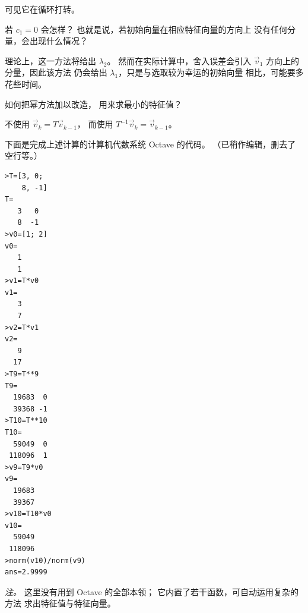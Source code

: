 \begin{exercises}
\begin{answer}
\begin{exparts}
\begin{lstlisting}
\end{lstlisting}
          可见它在循环打转。
       \end{exparts}
     \end{answer}
  \item
      若 $c_1=0$ 会怎样？
      也就是说，若初始向量在相应特征向量的方向上
      没有任何分量，会出现什么情况？
     \begin{answer}
       理论上，这一方法将给出 $\lambda_2$。
       然而在实际计算中，舍入误差会引入
       $\vec{v}_1$ 方向上的分量，因此该方法
       仍会给出 $\lambda_1$，只是与选取较为幸运的初始向量
       相比，可能要多花些时间。
     \end{answer}
  \item
    如何把幂方法加以改造，
    用来求最小的特征值？
    \begin{answer}
      不使用 $\vec{v}_k=T\vec{v}_{k-1}$，
      而使用 $T^{-1}\vec{v}_k=\vec{v}_{k-1}$。
    \end{answer}
\end{exercises}

\announcecomputercode
下面是完成上述计算的计算机代数系统 Octave 的代码。
（已稍作编辑，删去了空行等。）
\begin{lstlisting}
>T=[3, 0;
    8, -1]
T=
   3   0
   8  -1
>v0=[1; 2]
v0=
   1
   1
>v1=T*v0
v1=
   3
   7
>v2=T*v1
v2=
   9
  17
>T9=T**9
T9=
  19683  0
  39368 -1
>T10=T**10
T10=
  59049  0
 118096  1
>v9=T9*v0
v9=
  19683
  39367
>v10=T10*v0
v10=
  59049
 118096
>norm(v10)/norm(v9)
ans=2.9999
\end{lstlisting}
\textit{注。}
这里没有用到 Octave 的全部本领；
它内置了若干函数，可自动运用复杂的方法
求出特征值与特征向量。

\endinput






